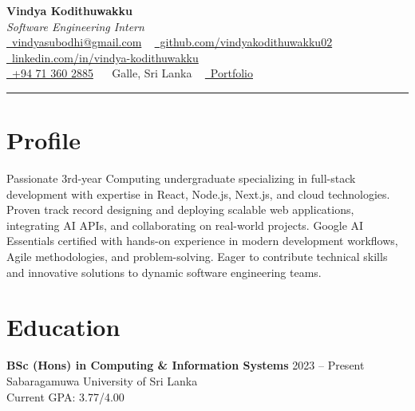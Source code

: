\documentclass[letterpaper,10.8pt]{article}
\begin{document}
\fontsize{10.5}{12}\selectfont

\begin{center}
{\Huge\color{accentTitle}\textbf{Vindya Kodithuwakku}}\\[3pt]
{\large\textit{Software Engineering Intern}}\\[4pt]
\href{mailto:vindyasubodhi@gmail.com}{\faEnvelope~vindyasubodhi@gmail.com} ~
\href{https://github.com/vindyakodithuwakku02}{\faGithub~github.com/vindyakodithuwakku02} ~
\href{https://www.linkedin.com/in/vindya-kodithuwakku-bb6187202}{\faLinkedin~linkedin.com/in/vindya-kodithuwakku}\\[2pt]
\href{tel:+94713602885}{\faPhone~+94 71 360 2885} ~
\faMapMarker*~Galle, Sri Lanka ~
\href{https://vindyakodithuwakku02.github.io/my_portfolio/}{\faGlobe~Portfolio}\\[4pt]
{\color{accentLine}\hrule}
\end{center}

\vspace{-20pt}
\section{Profile}
\vspace{-2pt}
\justifying
Passionate 3rd-year Computing undergraduate specializing in full-stack development with expertise in React, Node.js, Next.js, and cloud technologies. Proven track record designing and deploying scalable web applications, integrating AI APIs, and collaborating on real-world projects. Google AI Essentials certified with hands-on experience in modern development workflows, Agile methodologies, and problem-solving. Eager to contribute technical skills and innovative solutions to dynamic software engineering teams.

\section{Education}
\vspace{-1pt}

\noindent\textbf{BSc (Hons) in Computing \& Information Systems} \hfill 2023 – Present\\
\noindent Sabaragamuwa University of Sri Lanka\\
\noindent Current GPA: 3.77/4.00
\end{document}
